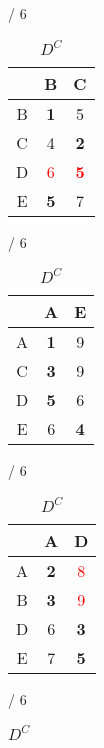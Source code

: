 \documentclass[a4paper, 11 pt, article, accentcolor=tud7b]{tudreport}
\begin{document}
	\begin{table}[h]
	  \begin{subtable}[b]{\textwidth / 6}
	    \begin{tabular}{| c | c | c |}
	      \hline
	        & B                   & C          \\ \hline
	      B & \textbf{1}          & 5          \\ \hline
	      C & 4                   & \textbf{2} \\ \hline
	      D & \textcolor{red}{6}  & \textbf{\textcolor{red}{5}} \\ \hline
	      E & \textbf{5}          & 7          \\ \hline
	    \end{tabular}
	    \caption{$D^{A}$}
	  \end{subtable}
	  \hfill
	  \begin{subtable}[b]{\textwidth / 6}
	    \begin{tabular}{| c | c | c |}
	    \hline
	      & A                   & E                  \\ \hline
	    A & \textbf{1}          & 9                  \\ \hline
	    C & \textbf{3}          & 9                  \\ \hline
	    D & \textbf{5}          & 6                  \\ \hline
	    E & 6                   & \textbf{4}         \\ \hline
	    \end{tabular}
	    \caption{$D^{B}$}
	  \end{subtable}
	  \hfill
	  \begin{subtable}[b]{\textwidth / 6}
	    \begin{tabular}{| c | c | c |}
	    \hline
	      & A                   & D                  \\ \hline
	    A & \textbf{2}          & \textcolor{red}{8} \\ \hline
	    B & \textbf{3}          & \textcolor{red}{9} \\ \hline
	    D & 6                   & \textbf{3}         \\ \hline
	    E & 7                   & \textbf{5}         \\ \hline
	    \end{tabular}
	    \caption{$D^{C}$}
	  \end{subtable}
    \hfill
	  \begin{subtable}[b]{\textwidth / 6}
	    \begin{tabular}{| c | c | c |}

\end{tabular}
\end{subtable}
\end{table}
\end{document}
